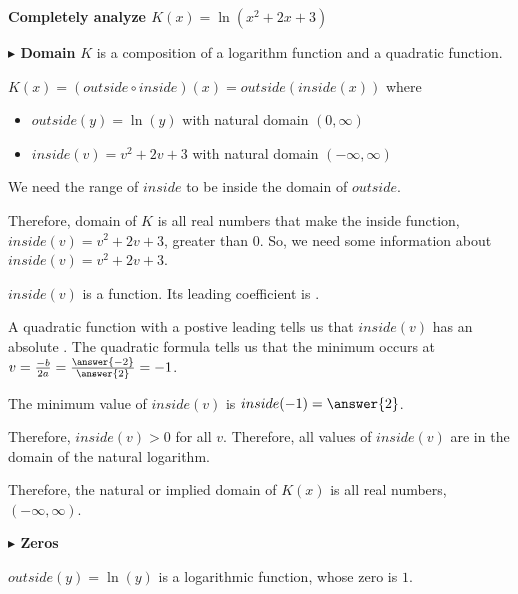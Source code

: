 \documentclass{ximera}
\begin{document}
\begin{example}

\textbf{\textcolor{purple!85!blue}{Completely analyze $K(x) = \ln(x^2+2x+3)$}} 



\textbf{\textcolor{blue!55!black}{$\blacktriangleright$ Domain}}  $K$ is a composition of a logarithm function and a quadratic function. 


$K(x) = (outside \circ inside)(x) = outside(inside(x))$ where


\begin{itemize}
\item $outside(y) = \ln(y)$ with natural domain  $(0, \infty)$ \\
\item $inside(v) = v^2 + 2v + 3$ with natural domain $(-\infty, \infty)$
\end{itemize}


We need the range of $inside$ to be inside the domain of $outside$.

Therefore, domain of $K$ is all real numbers that make the inside function, $inside(v)=v^2+2v+3$, greater than $0$.  So, we need some information about $inside(v)=v^2+2v+3$.  


$inside(v)$ is a   function.  Its leading coefficient is . 


A quadratic function with a postive leading tells us that $inside(v)$ has an absolute .  The quadratic formula tells us that the minimum occurs at $v=\frac{-b}{2a} = \frac{\answer{-2}}{\answer{2}} = -1$. 

The minimum value of $inside(v)$ is $inside(-1) = \answer{2}$.  

Therefore, $inside(v) > 0$ for all $v$. Therefore, all values of $inside(v)$ are in the domain of the natural logarithm. 

Therefore, the natural or implied domain of $K(x)$ is all real numbers, $(-\infty, \infty)$. 









\textbf{\textcolor{blue!55!black}{$\blacktriangleright$ Zeros}} 


$outside(y) = \ln(y)$ is a logarithmic function, whose zero is $1$. 


\end{example}
\end{document}
